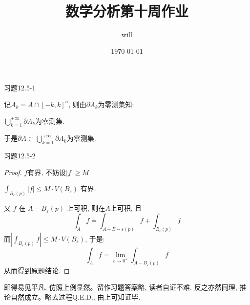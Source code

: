 \documentclass[11pt,a4paper]{TGhomework}
\title{\textbf{数学分析第十周作业}}
\author{will}
\date{\today}
\begin{document}
\maketitle
\setlength{\parindent}{0pt}

\begin{problem}
习题12.5-1
\end{problem}

\begin{solution}
    记$A_k=A \cap[-k, k]^n$, 则由$\partial A_k$为零测集知:

    $\bigcup\limits_{k=1}^{+\infty} \partial A_k$为零测集.

    于是$\partial A \subset \bigcup\limits_{k=1}^{+\infty} \partial A_k$为零测集.

\end{solution}

\begin{problem}
习题12.5-2
\end{problem}

\begin{proof}
    $f$有界, 不妨设$|f| \geqslant M$

    $\int_{B_\varepsilon(p)}|f| \leq M \cdot V(B_\varepsilon)$ 有界.

    又 $f$ 在 $A-B_\varepsilon(p)$ 上可积, 则在$A$上可积, 且
    $$
        \int_A f=\int_{A - B-\varepsilon(p)} f+\int_{B_\varepsilon(p)} f
    $$
    而$\left|\int_{B_\varepsilon(p)} f\right| \leq M \cdot V\left(B_{\varepsilon}\right)$, 于是:
    $$
        \int_A f=\lim _{\varepsilon \to 0^{+}} \int_{A-B_\varepsilon(p)} f
    $$
从而得到原题结论.
\end{proof}

\begin{note}
    即得易见平凡, 仿照上例显然。留作习题答案略, 读者自证不难. 反之亦然同理, 推论自然成立。略去过程Q.E.D., 由上可知证毕.
\end{note}
\end{document}
